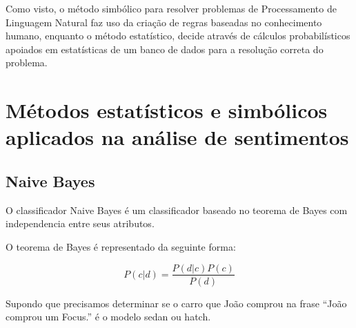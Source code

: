 Como visto, o método simbólico para resolver problemas de Processamento de
Linguagem Natural faz uso da criação de regras baseadas no conhecimento humano,
enquanto o método estatístico, decide através de cálculos probabilísticos
apoiados em estatísticas de um banco de dados para a resolução correta do
problema.


% 
% 
% 

\section{Métodos estatísticos e simbólicos aplicados na análise de sentimentos}
\label{cap:Classificadores}


\subsection{Naive Bayes}

O classificador Naive Bayes é um classificador baseado no teorema de Bayes com
independencia entre seus atributos.

O teorema de Bayes é representado da seguinte forma:

\[ P(c|d) = \frac{P(d|c) P(c)}{P(d)}  \]

Supondo que precisamos determinar se o carro que João comprou na frase ``João
comprou um Focus.'' é o modelo sedan ou hatch.
 
